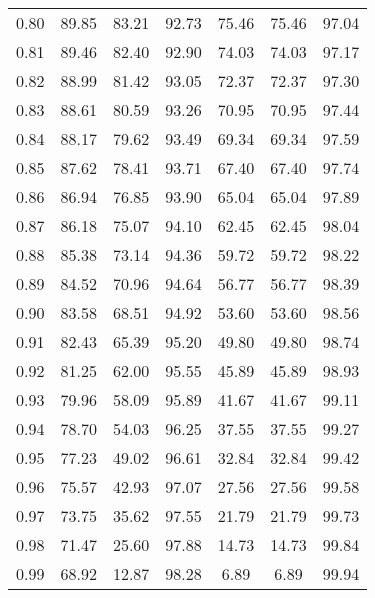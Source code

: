 \begin{tabular}{|c|c|c|c|c|c|c|}
      0.80 &     89.85 &     83.21 &      92.73 &   75.46 &      75.46 &         97.04 \\
      0.81 &     89.46 &     82.40 &      92.90 &   74.03 &      74.03 &         97.17 \\
      0.82 &     88.99 &     81.42 &      93.05 &   72.37 &      72.37 &         97.30 \\
      0.83 &     88.61 &     80.59 &      93.26 &   70.95 &      70.95 &         97.44 \\
      0.84 &     88.17 &     79.62 &      93.49 &   69.34 &      69.34 &         97.59 \\
      0.85 &     87.62 &     78.41 &      93.71 &   67.40 &      67.40 &         97.74 \\
      0.86 &     86.94 &     76.85 &      93.90 &   65.04 &      65.04 &         97.89 \\
      0.87 &     86.18 &     75.07 &      94.10 &   62.45 &      62.45 &         98.04 \\
      0.88 &     85.38 &     73.14 &      94.36 &   59.72 &      59.72 &         98.22 \\
      0.89 &     84.52 &     70.96 &      94.64 &   56.77 &      56.77 &         98.39 \\
      0.90 &     83.58 &     68.51 &      94.92 &   53.60 &      53.60 &         98.56 \\
      0.91 &     82.43 &     65.39 &      95.20 &   49.80 &      49.80 &         98.74 \\
      0.92 &     81.25 &     62.00 &      95.55 &   45.89 &      45.89 &         98.93 \\
      0.93 &     79.96 &     58.09 &      95.89 &   41.67 &      41.67 &         99.11 \\
      0.94 &     78.70 &     54.03 &      96.25 &   37.55 &      37.55 &         99.27 \\
      0.95 &     77.23 &     49.02 &      96.61 &   32.84 &      32.84 &         99.42 \\
      0.96 &     75.57 &     42.93 &      97.07 &   27.56 &      27.56 &         99.58 \\
      0.97 &     73.75 &     35.62 &      97.55 &   21.79 &      21.79 &         99.73 \\
      0.98 &     71.47 &     25.60 &      97.88 &   14.73 &      14.73 &         99.84 \\
      0.99 &     68.92 &     12.87 &      98.28 &    6.89 &       6.89 &         99.94 \\
\bottomrule
\end{tabular}
